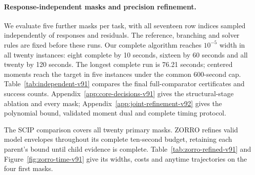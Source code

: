 \paragraph{Response-independent masks and precision refinement.}
We evaluate five further masks per task, with all seventeen row indices sampled independently of responses and residuals. The reference, branching and solver rules are fixed before these runs. Our complete algorithm reaches $10^{-5}$ width in all twenty instances: eight complete by 10 seconds, sixteen by 60 seconds and all twenty by 120 seconds. The longest complete run is 76.21 seconds; centered moments reach the target in five instances under the common 600-second cap. Table~\ref{tab:independent-v91} compares the final full-comparator certificates and success counts. Appendix~\ref{app:core-decisions-v91} gives the structural-stage ablation and every mask; Appendix~\ref{app:joint-refinement-v92} gives the polynomial bound, validated moment dual and complete timing protocol.


The SCIP comparison covers all twenty primary masks. ZORRO refines valid model envelopes throughout its complete ten-second budget, retaining each parent's bound until child evidence is complete. Table~\ref{tab:zorro-refined-v91} and Figure~\ref{fig:zorro-time-v91} give its widths, costs and anytime trajectories on the four first masks.
